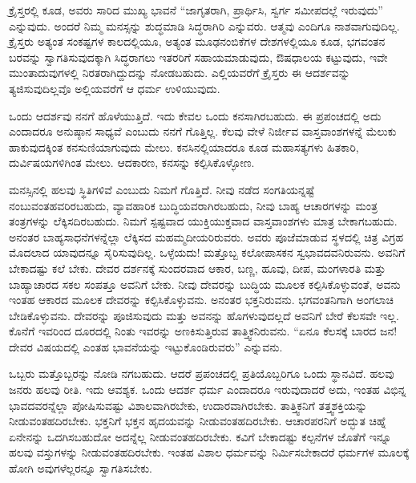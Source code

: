 \vskip 5pt

ಕ್ರೈಸ್ತರಲ್ಲಿ ಕೂಡ, ಅವರು ಸಾರಿದ ಮುಖ್ಯ ಭಾವನೆ “ಜಾಗೃತರಾಗಿ, ಪ್ರಾರ್ಥಿಸಿ, ಸ್ವರ್ಗ ಸಮೀಪದಲ್ಲೆ ಇರುವುದು” ಎನ್ನುವುದು. ಅಂದರೆ ನಿಮ್ಮ ಮನಸ್ಸನ್ನು ಶುದ್ಧಮಾಡಿ ಸಿದ್ಧರಾಗಿರಿ ಎನ್ನುವರು. ಆತ್ಮವು ಎಂದಿಗೂ ನಾಶವಾಗುವುದಿಲ್ಲ. ಕ್ರೈಸ್ತರು ಅತ್ಯಂತ ಸಂಕಷ್ಟಗಳ ಕಾಲದಲ್ಲಿಯೂ, ಅತ್ಯಂತ ಮೂಢನಂಬಿಕೆಗಳ ದೇಶಗಳಲ್ಲಿಯೂ ಕೂಡ, ಭಗವಂತನ ಬರವನ್ನು ಸ್ವಾಗತಿಸುವುದಕ್ಕಾಗಿ ಸಿದ್ಧರಾಗಲು ಇತರರಿಗೆ ಸಹಾಯಮಾಡುವುದು, ಔಷಧಾಲಯ ಕಟ್ಟುವುದು, ಇವೇ ಮುಂತಾದುವುಗಳಲ್ಲಿ ನಿರತರಾಗಿದ್ದುದನ್ನು ನೋಡಬಹುದು. ಎಲ್ಲಿಯವರೆಗೆ ಕ್ರೈಸ್ತರು ಈ ಆದರ್ಶವನ್ನು ತ್ಯಜಿಸುವುದಿಲ್ಲವೊ ಅಲ್ಲಿಯವರೆಗೆ ಆ ಧರ್ಮ ಉಳಿಯುವುದು.

\vskip 5pt

ಒಂದು ಆದರ್ಶವು ನನಗೆ ಹೊಳೆಯುತ್ತಿದೆ. ಇದು ಕೇವಲ ಒಂದು ಕನಸಾಗಿರಬಹುದು. ಈ ಪ್ರಪಂಚದಲ್ಲಿ ಅದು ಎಂದಾದರೂ ಅನುಷ್ಠಾನ ಸಾಧ್ಯವೆ ಎಂಬುದು ನನಗೆ ಗೊತ್ತಿಲ್ಲ. ಕೆಲವು ವೇಳೆ ನಿರ್ಜೀವ ವಾಸ್ತವಾಂಶಗಳನ್ನೆ ಮೆಲುಕು ಹಾಕುವುದಕ್ಕಿಂತ ಕನಸುಣಿಯಾಗುವುದು ಮೇಲು. ಕನಸಿನಲ್ಲಿಯಾದರೂ ಕೂಡ ಮಹಾಸತ್ಯಗಳು ಹಿತಕಾರಿ, ದುರ್ವಿಷಯಗಳಿಗಿಂತ ಮೇಲು. ಆದಕಾರಣ, ಕನಸನ್ನು ಕಲ್ಪಿಸಿಕೊಳ್ಳೋಣ.

\vskip 6pt

ಮನಸ್ಸಿನಲ್ಲಿ ಹಲವು ಸ್ಥಿತಿಗಳಿವೆ ಎಂಬುದು ನಿಮಗೆ ಗೊತ್ತಿದೆ. ನೀವು ನಡೆದ ಸಂಗತಿಯನ್ನಷ್ಟೆ ನಂಬುವಂತಹವರಿರಬಹುದು, ವ್ಯಾವಹಾರಿಕ ಬುದ್ಧಿಯವರಾಗಿರಬಹುದು, ನೀವು ಬಾಹ್ಯ ಆಚಾರಗಳನ್ನು ಮಂತ್ರ ತಂತ್ರಗಳನ್ನು ಲೆಕ್ಕಿಸದಿರಬಹುದು. ನಿಮಗೆ ಸ್ಪಷ್ಟವಾದ ಯುಕ್ತಿಯುಕ್ತವಾದ ವಾಸ್ತವಾಂಶಗಳು ಮಾತ್ರ ಬೇಕಾಗಬಹುದು. ಅನಂತರ ಬಾಹ್ಯಸಾಧನೆಗಳನ್ನೆಲ್ಲಾ ಲೆಕ್ಕಿಸದ ಮಹಮ್ಮದೀಯರಿರುವರು. ಅವರು ಪೂಜೆಮಾಡುವ ಸ್ಥಳದಲ್ಲಿ ಚಿತ್ರ ವಿಗ್ರಹ ಮೊದಲಾದ ಯಾವುದನ್ನೂ ಸೈರಿಸುವುದಿಲ್ಲ. ಒಳ್ಳೆಯದು! ಮತ್ತೊಬ್ಬ ಕಲೋಪಾಸಕನ ಸ್ವಭಾವದವನಿರುವನು. ಅವನಿಗೆ ಬೇಕಾದಷ್ಟು ಕಲೆ ಬೇಕು. ದೇವರ ದರ್ಶನಕ್ಕೆ ಸುಂದರವಾದ ಆಕಾರ, ಬಣ್ಣ, ಹೂವು, ದೀಪ, ಮಂಗಳಾರತಿ ಮತ್ತು ಬಾಹ್ಯಾಚಾರದ ಸಕಲ ಸಂಪತ್ತೂ ಅವನಿಗೆ ಬೇಕು. ನೀವು ದೇವರನ್ನು ಬುದ್ಧಿಯ ಮೂಲಕ ಕಲ್ಪಿಸಿಕೊಳ್ಳುವಂತೆ, ಅವನು ಇಂತಹ ಆಕಾರದ ಮೂಲಕ ದೇವರನ್ನು ಕಲ್ಪಿಸಿಕೊಳ್ಳುವನು. ಅನಂತರ ಭಕ್ತನಿರುವನು. ಭಗವಂತನಿಗಾಗಿ ಅಂಗಲಾಚಿ ಬೇಡಿಕೊಳ್ಳುವನು. ದೇವರನ್ನು ಪೂಜಿಸುವುದು ಮತ್ತು ಅವನನ್ನು ಹೊಗಳುವುದಲ್ಲದೆ ಅವನಿಗೆ ಬೇರೆ ಕೆಲಸವೇ ಇಲ್ಲ. ಕೊನೆಗೆ ಇವರಿಂದ ದೂರದಲ್ಲಿ ನಿಂತು ಇವರನ್ನು ಅಣಕಿಸುತ್ತಿರುವ ತಾತ್ತ್ವಿಕನಿರುವನು. “ಏನೂ ಕೆಲಸಕ್ಕೆ ಬಾರದ ಜನ! ದೇವರ ವಿಷಯದಲ್ಲಿ ಎಂತಹ ಭಾವನೆಯನ್ನು ಇಟ್ಟುಕೊಂಡಿರುವರು” ಎನ್ನುವನು.

\vskip 5pt

ಒಬ್ಬರು ಮತ್ತೊಬ್ಬರನ್ನು ನೋಡಿ ನಗಬಹುದು. ಆದರೆ ಪ್ರಪಂಚದಲ್ಲಿ ಪ್ರತಿಯೊಬ್ಬರಿಗೂ ಒಂದು ಸ್ಥಾನವಿದೆ. ಹಲವು ಜನರು ಹಲವು ರೀತಿ. ಇದು ಆವಶ್ಯಕ. ಒಂದು ಆದರ್ಶ ಧರ್ಮ ಎಂದಾದರೂ ಇರುವುದಾದರೆ ಅದು, ಇಂತಹ ವಿಭಿನ್ನ ಭಾವದವರನ್ನೆಲ್ಲಾ ಪೋಷಿಸುವಷ್ಟು ವಿಶಾಲವಾಗಿರಬೇಕು, ಉದಾರವಾಗಿರಬೇಕು. ತಾತ್ತ್ವಿಕನಿಗೆ ತತ್ತ್ವಶಕ್ತಿಯನ್ನು ನೀಡುವಂತಹದಿರಬೇಕು. ಭಕ್ತನಿಗೆ ಭಕ್ತನ ಹೃದಯವನ್ನು ನೀಡುವಂತಹದಿರಬೇಕು. ಆಚಾರಪರನಿಗೆ ಅದ್ಭುತ ಚಿಹ್ನೆ ಏನೇನನ್ನು ಒದಗಿಸಬಹುದೋ ಅದನ್ನೆಲ್ಲ ನೀಡುವಂತಹದಿರಬೇಕು. ಕವಿಗೆ ಬೇಕಾದಷ್ಟು ಕಲ್ಪನೆಗಳ ಜೊತೆಗೆ ಇನ್ನೂ ಹಲವು ವಸ್ತುಗಳನ್ನು ನೀಡುವಂತಹದಿರಬೇಕು. ಇಂತಹ ವಿಶಾಲ ಧರ್ಮವನ್ನು ನಿರ್ಮಿಸಬೇಕಾದರೆ ಧರ್ಮಗಳ ಮೂಲಕ್ಕೆ ಹೋಗಿ ಅವುಗಳೆಲ್ಲರನ್ನೂ ಸ್ವಾಗತಿಸಬೇಕು.

\vskip 5pt

